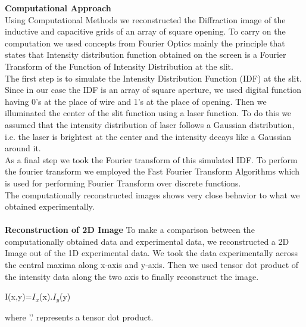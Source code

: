 \documentclass[12pt]{report}
\begin{document}
\textbf{Computational Approach}\\
Using Computational Methods we reconstructed the Diffraction image of the inductive and capacitive grids of an array of square opening. To carry on the computation we used concepts from Fourier Optics mainly the principle that states that Intensity distribution function obtained on the screen is a Fourier Transform of the Function of Intensity Distribution at the slit.\\ 
The first step is to simulate the Intensity Distribution Function (IDF) at the slit. Since in our case the IDF is an array of square aperture, we used digital function having 0's at the place of wire and 1's at the place of opening. Then we illuminated the center of the slit function using a laser function. To do this we assumed that the intensity distribution of laser follows a Gaussian distribution, i.e. the laser is brightest at the center and the intensity decays like a Gaussian around it.\\   
As a final step we took the Fourier transform of this simulated IDF. To perform the fourier transform we employed the Fast Fourier Transform Algorithms which is used for performing Fourier Transform over discrete functions.\\
The computationally reconstructed images shows very close behavior to what we obtained experimentally.\\ \\
\textbf{Reconstruction of 2D Image}
To make a comparison between the computationally obtained data and experimental data, we reconstructed a 2D Image out of the 1D experimental data. We took the data experimentally across the central maxima along x-axis and y-axis. Then we used tensor dot product of the intensity data along the two axis to finally reconstruct the image.    
\begin{center}
	I(x,y)=$I_x$(x).$I_y$(y)
\end{center}
where '.' represents a tensor dot product.\\
\newpage
\end{document}
